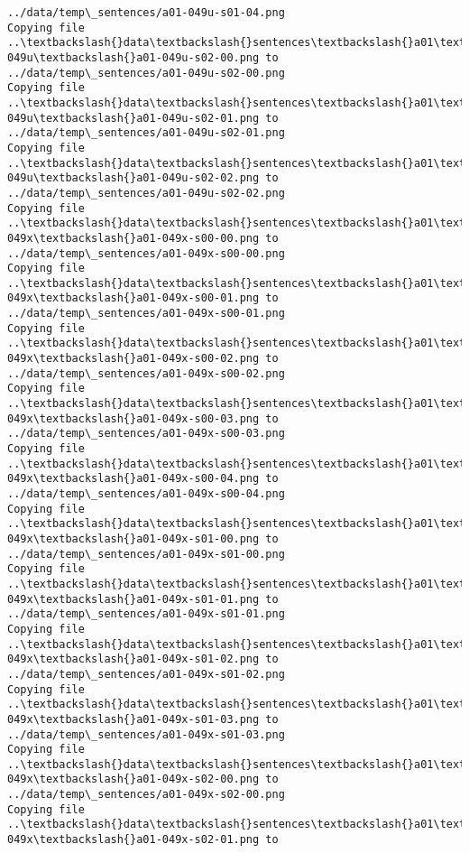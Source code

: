 \documentclass[11pt]{article}
\begin{document}
\begin{Verbatim}[commandchars=\\\{\}]
../data/temp\_sentences/a01-049u-s01-04.png
Copying file ..\textbackslash{}data\textbackslash{}sentences\textbackslash{}a01\textbackslash{}a01-049u\textbackslash{}a01-049u-s02-00.png to
../data/temp\_sentences/a01-049u-s02-00.png
Copying file ..\textbackslash{}data\textbackslash{}sentences\textbackslash{}a01\textbackslash{}a01-049u\textbackslash{}a01-049u-s02-01.png to
../data/temp\_sentences/a01-049u-s02-01.png
Copying file ..\textbackslash{}data\textbackslash{}sentences\textbackslash{}a01\textbackslash{}a01-049u\textbackslash{}a01-049u-s02-02.png to
../data/temp\_sentences/a01-049u-s02-02.png
Copying file ..\textbackslash{}data\textbackslash{}sentences\textbackslash{}a01\textbackslash{}a01-049x\textbackslash{}a01-049x-s00-00.png to
../data/temp\_sentences/a01-049x-s00-00.png
Copying file ..\textbackslash{}data\textbackslash{}sentences\textbackslash{}a01\textbackslash{}a01-049x\textbackslash{}a01-049x-s00-01.png to
../data/temp\_sentences/a01-049x-s00-01.png
Copying file ..\textbackslash{}data\textbackslash{}sentences\textbackslash{}a01\textbackslash{}a01-049x\textbackslash{}a01-049x-s00-02.png to
../data/temp\_sentences/a01-049x-s00-02.png
Copying file ..\textbackslash{}data\textbackslash{}sentences\textbackslash{}a01\textbackslash{}a01-049x\textbackslash{}a01-049x-s00-03.png to
../data/temp\_sentences/a01-049x-s00-03.png
Copying file ..\textbackslash{}data\textbackslash{}sentences\textbackslash{}a01\textbackslash{}a01-049x\textbackslash{}a01-049x-s00-04.png to
../data/temp\_sentences/a01-049x-s00-04.png
Copying file ..\textbackslash{}data\textbackslash{}sentences\textbackslash{}a01\textbackslash{}a01-049x\textbackslash{}a01-049x-s01-00.png to
../data/temp\_sentences/a01-049x-s01-00.png
Copying file ..\textbackslash{}data\textbackslash{}sentences\textbackslash{}a01\textbackslash{}a01-049x\textbackslash{}a01-049x-s01-01.png to
../data/temp\_sentences/a01-049x-s01-01.png
Copying file ..\textbackslash{}data\textbackslash{}sentences\textbackslash{}a01\textbackslash{}a01-049x\textbackslash{}a01-049x-s01-02.png to
../data/temp\_sentences/a01-049x-s01-02.png
Copying file ..\textbackslash{}data\textbackslash{}sentences\textbackslash{}a01\textbackslash{}a01-049x\textbackslash{}a01-049x-s01-03.png to
../data/temp\_sentences/a01-049x-s01-03.png
Copying file ..\textbackslash{}data\textbackslash{}sentences\textbackslash{}a01\textbackslash{}a01-049x\textbackslash{}a01-049x-s02-00.png to
../data/temp\_sentences/a01-049x-s02-00.png
Copying file ..\textbackslash{}data\textbackslash{}sentences\textbackslash{}a01\textbackslash{}a01-049x\textbackslash{}a01-049x-s02-01.png to

\end{Verbatim}
\end{document}
